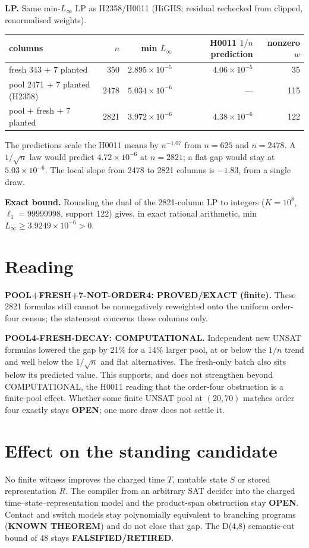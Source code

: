\documentclass[11pt]{article}
\begin{document}
\textbf{LP.} Same min-$L_\infty$ LP as H2358/H0011 (HiGHS; residual rechecked from clipped, renormalised weights).
\begin{center}\begin{tabular}{lrrrr}\toprule
columns & $n$ & min $L_\infty$ & H0011 $1/n$ prediction & nonzero $w$\\\midrule
fresh 343 + 7 planted & 350 & $2.895\times10^{-5}$ & $4.06\times10^{-5}$ & 35\\
pool 2471 + 7 planted (H2358) & 2478 & $5.034\times10^{-6}$ & --- & 115\\
pool + fresh + 7 planted & 2821 & $3.972\times10^{-6}$ & $4.38\times10^{-6}$ & 122\\\bottomrule
\end{tabular}\end{center}
The predictions scale the H0011 means by $n^{-1.07}$ from $n=625$ and $n=2478$. A $1/\sqrt n$ law would predict $4.72\times10^{-6}$ at $n=2821$; a flat gap would stay at $5.03\times10^{-6}$. The local slope from 2478 to 2821 columns is $-1.83$, from a single draw.

\textbf{Exact bound.} Rounding the dual of the 2821-column LP to integers ($K=10^8$, $\ell_1=99999998$, support 122) gives, in exact rational arithmetic, min $L_\infty\ge3.9249\times10^{-6}>0$.

\section*{Reading}
\textbf{POOL+FRESH+7-NOT-ORDER4: PROVED/EXACT (finite).} These 2821 formulas still cannot be nonnegatively reweighted onto the uniform order-four census; the statement concerns these columns only.

\textbf{POOL4-FRESH-DECAY: COMPUTATIONAL.} Independent new UNSAT formulas lowered the gap by 21\% for a 14\% larger pool, at or below the $1/n$ trend and well below the $1/\sqrt n$ and flat alternatives. The fresh-only batch also sits below its predicted value. This supports, and does not strengthen beyond COMPUTATIONAL, the H0011 reading that the order-four obstruction is a finite-pool effect. Whether some finite UNSAT pool at $(20,70)$ matches order four exactly stays \textbf{OPEN}; one more draw does not settle it.

\section*{Effect on the standing candidate}
No finite witness improves the charged time $T$, mutable state $S$ or stored representation $R$. The compiler from an arbitrary SAT decider into the charged time--state--representation model and the product-span obstruction stay \textbf{OPEN}. Contact and switch models stay polynomially equivalent to branching programs (\textbf{KNOWN THEOREM}) and do not close that gap. The D(4,8) semantic-cut bound of 48 stays \textbf{FALSIFIED/RETIRED}.
\end{document}
